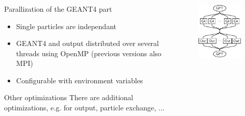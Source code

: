 \documentclass{beamer}
\newcommand{\ident}{\thesection.\thesubsection}
\newcommand{\ftitle}{\frametitle{\nameref{\ident}}}
\newcommand{\geant}{G{\smaller EANT}4 }
\begin{document}
\begin{frame}
	\ftitle
	\begin{columns}
		\begin{column}{7cm}
			\begin{block}{Parallization of the \geant part}
				\begin{itemize}
					\item Single particles are independant
					\item \geant and output distributed over several threads using OpenMP (previous versions also MPI)
					\item Configurable with environment variables
				\end{itemize}
			\end{block}
			\pause
			\begin{exampleblock}{Other optimizations}
				There are additional optimizations, e.g. for output, particle exchange, ...
			\end{exampleblock}
		\end{column}
		\begin{column}{4cm}
			\begin{figure}
				\includegraphics[width=\columnwidth]{img/parallel_flow}
			\end{figure}
		\end{column}
	\end{columns}
\end{frame}
\end{document}
